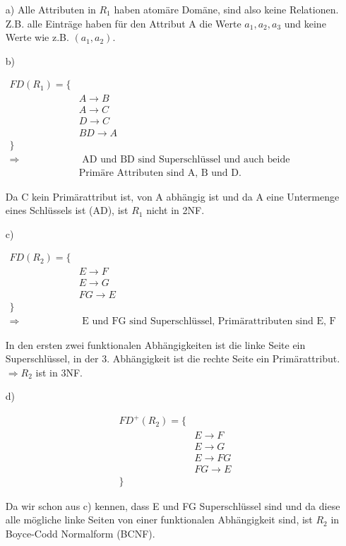 \begin{enumerate}

\item[a)]
Alle Attributen in $R_1$ haben atomäre Domäne, sind also keine Relationen. Z.B. alle Einträge haben für den Attribut A die Werte $a_1, a_2, a_3$ und keine Werte wie z.B. $(a_1, a_2)$.

\item[b)]

\begin{align*}
    FD(R_1) = \{ & \\
    & A \rightarrow B \\
    & A \rightarrow C \\
    & D \rightarrow C \\
    & BD \rightarrow A \\
    \} & \\
    \Rightarrow & \text{ AD und BD sind Superschlüssel und auch beide Kandidatschlüsseln.} \\
    & \text{Primäre Attributen sind A, B und D. }
\end{align*}

Da C kein Primärattribut ist, von A abhängig ist und da A eine Untermenge eines Schlüssels ist (AD), ist $R_1$ nicht in 2NF.

\item[c)]

\begin{align*}
    FD(R_2) = \{ & \\
    & E \rightarrow F \\
    & E \rightarrow G \\
    & FG \rightarrow E \\
    \} & \\
    \Rightarrow & \text{ E und FG sind Superschlüssel, Primärattributen sind E, F und G. }
\end{align*}

In den ersten zwei funktionalen Abhängigkeiten ist die linke Seite ein Superschlüssel, in der 3. Abhängigkeit ist die rechte Seite ein Primärattribut.
$\Rightarrow R_2$ ist in 3NF.

\item[d)]

\begin{align*}
    FD^{+}(R_2) = \{ & \\
    & E \rightarrow F \\
    & E \rightarrow G \\
    & E \rightarrow FG \\
    & FG \rightarrow E \\
    \} &
\end{align*}

Da wir schon aus c) kennen, dass E und FG Superschlüssel sind und da diese alle mögliche linke Seiten von einer funktionalen Abhängigkeit sind, ist $R_2$ in Boyce-Codd Normalform (BCNF).

\end{enumerate}

